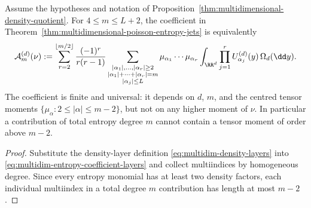 \begin{corollary}%
\label{cor:multidim-coefficient-formula}
Assume the hypotheses and notation of
Proposition~\ref{thm:multidimensional-density-quotient}.  For \(4\le m\le L+2\),
the coefficient in Theorem~\ref{thm:multidimensional-poisson-entropy-jets}
is equivalently
\begin{equation}\label{eq:multidim-entropy-coefficient}
\mathcal A_m^{(d)}(\nu):=
\sum_{r=2}^{\lfloor m/2\rfloor}
\frac{(-1)^r}{r(r-1)}
\sum_{\substack{|\alpha_1|,\ldots,|\alpha_r|\ge2\\
|\alpha_1|+\cdots+|\alpha_r|=m\\
|\alpha_j|\le L}}
\mu_{\alpha_1}\cdots\mu_{\alpha_r}
\int_{\RR^d}\prod_{j=1}^rU_{\alpha_j}^{(d)}(y)\,\Omega_d(\dd y).
\end{equation}
The coefficient is finite and universal: it depends on \(d\), \(m\), and the
centred tensor moments
\(\{\mu_\alpha:2\le|\alpha|\le m-2\}\), but not on any higher moment of
\(\nu\).  In particular a contribution of total entropy degree \(m\) cannot
contain a tensor moment of order above \(m-2\).
\end{corollary}

\begin{proof}
Substitute the density-layer definition
\eqref{eq:multidim-density-layers} into
\eqref{eq:multidim-entropy-coefficient-layers} and collect multiindices by
homogeneous degree.  Since every entropy monomial has at least two density
factors, each individual multiindex in a total degree \(m\) contribution has
length at most \(m-2\).
\end{proof}

